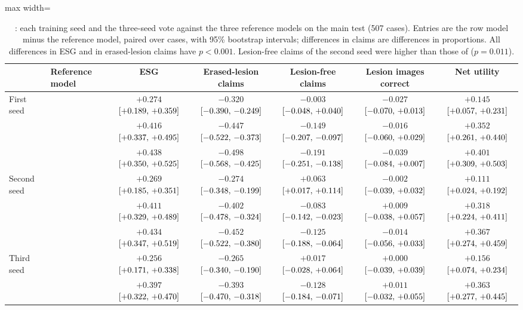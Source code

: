 \begin{table}[!htbp]
\caption{\msn{}: each training seed and the three-seed vote against the three reference models on the main test (507 cases). Entries are the row model minus the reference model, paired over cases, with 95\% bootstrap intervals; differences in claims are differences in proportions. All differences in ESG and in erased-lesion claims have $p < 0.001$. Lesion-free claims of the second seed were higher than those of \gem{} ($p = 0.011$).}
\label{tab:s_nseeds_ref}
\centering
\footnotesize
\begin{adjustbox}{max width=\linewidth}
\begin{tabular}{ll ccccc}
\toprule
\msn{} & Reference model & ESG & Erased-lesion claims & Lesion-free claims & Lesion images correct & Net utility \\
\midrule
First seed & \gem{} & $+0.274$ $[+0.189,\,+0.359]$ & $-0.320$ $[-0.390,\,-0.249]$ & $-0.003$ $[-0.048,\,+0.040]$ & $-0.027$ $[-0.070,\,+0.013]$ & $+0.145$ $[+0.057,\,+0.231]$ \\
 & \opus{} & $+0.416$ $[+0.337,\,+0.495]$ & $-0.447$ $[-0.522,\,-0.373]$ & $-0.149$ $[-0.207,\,-0.097]$ & $-0.016$ $[-0.060,\,+0.029]$ & $+0.352$ $[+0.261,\,+0.440]$ \\
 & \gpt{} & $+0.438$ $[+0.350,\,+0.525]$ & $-0.498$ $[-0.568,\,-0.425]$ & $-0.191$ $[-0.251,\,-0.138]$ & $-0.039$ $[-0.084,\,+0.007]$ & $+0.401$ $[+0.309,\,+0.503]$ \\
\midrule
Second seed & \gem{} & $+0.269$ $[+0.185,\,+0.351]$ & $-0.274$ $[-0.348,\,-0.199]$ & $+0.063$ $[+0.017,\,+0.114]$ & $-0.002$ $[-0.039,\,+0.032]$ & $+0.111$ $[+0.024,\,+0.192]$ \\
 & \opus{} & $+0.411$ $[+0.329,\,+0.489]$ & $-0.402$ $[-0.478,\,-0.324]$ & $-0.083$ $[-0.142,\,-0.023]$ & $+0.009$ $[-0.038,\,+0.057]$ & $+0.318$ $[+0.224,\,+0.411]$ \\
 & \gpt{} & $+0.434$ $[+0.347,\,+0.519]$ & $-0.452$ $[-0.522,\,-0.380]$ & $-0.125$ $[-0.188,\,-0.064]$ & $-0.014$ $[-0.056,\,+0.033]$ & $+0.367$ $[+0.274,\,+0.459]$ \\
\midrule
Third seed & \gem{} & $+0.256$ $[+0.171,\,+0.338]$ & $-0.265$ $[-0.340,\,-0.190]$ & $+0.017$ $[-0.028,\,+0.064]$ & $+0.000$ $[-0.039,\,+0.039]$ & $+0.156$ $[+0.074,\,+0.234]$ \\
 & \opus{} & $+0.397$ $[+0.322,\,+0.470]$ & $-0.393$ $[-0.470,\,-0.318]$ & $-0.128$ $[-0.184,\,-0.071]$ & $+0.011$ $[-0.032,\,+0.055]$ & $+0.363$ $[+0.277,\,+0.445]$ \\

\end{tabular}
\end{adjustbox}
\end{table}
